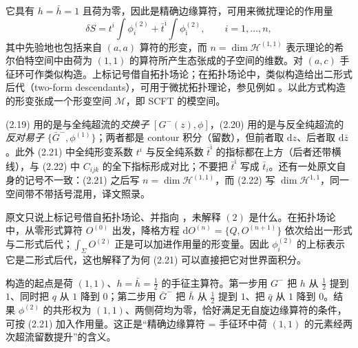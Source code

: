 它具有 $h=\bar h=1$ 且荷为零，因此是精确边缘算符，可用来微扰理论的作用量
\begin{equation}\tag{2.21}
\delta S=t^{i}\int\phi_{i}^{(2)}+\bar t^{\bar{\imath}}\int\phi_{\bar{\imath}}^{(2)},\qquad i=1,\ldots,n,
\end{equation}
其中先验地也包括来自 $(a,a)$ 算符的形变，而 $n=\dim\mathcal{H}^{(1,1)}$ 表示理论的希尔伯特空间中由荷为 $(1,1)$ 的算符所产生态张成的子空间的维数。对 $(a,c)$ 手征环可作类似构造。上标记号借自拓扑场论；在拓扑场论中，类似构造给出二形式后代（two-form descendants），可用于微扰拓扑理论，参见例如 \cite{ref33}。以此方式构造的形变张成一个形变空间 $\mathcal{M}$，即 SCFT 的模空间。

\begin{yizhu}[易错点]
(2.19) 用的是与全纯超流的\emph{交换子} $[G^{-}(z),\phi]$，(2.20) 用的是与反全纯超流的\emph{反对易子} $\{\bar G^{-},\phi^{(1)}\}$；两者都是 contour 积分（留数），但前者取 $\mathrm{d}z$、后者取 $\mathrm{d}\bar z$。此外 (2.21) 中全纯形变系数 $t^{i}$ 与反全纯系数 $\bar t^{\bar{\imath}}$ 的指标都在上方（后者还带横线），与 (2.22) 中 $C_{ijk}$ 的全下指标形成对比；不要把 $\bar t^{\bar{\imath}}$ 写成 $\bar t_{i}$。还有一处原文自身的记号不一致：(2.21) 之后写 $n=\dim\mathcal{H}^{(1,1)}$，而 (2.22) 写 $\dim\mathcal{H}^{1,1}$，同一空间带不带括号混用，译文照录。
\end{yizhu}

\begin{yizhu}[含糊点]
原文只说上标记号借自拓扑场论、并指向 \cite{ref33}，未解释 $(2)$ 是什么。在拓扑场论中，从零形式算符 $O^{(0)}$ 出发，降格方程 $\mathrm{d}O^{(n)}=\{Q,O^{(n+1)}\}$ 依次给出一形式与二形式后代；$\int_{\Sigma}O^{(2)}$ 正是可以加进作用量的形变量。因此 $\phi_{i}^{(2)}$ 的上标表示它是二形式后代，这也解释了为何 (2.21) 可以直接把它对世界面积分。
\end{yizhu}

\begin{yizhu}[物理图像]
构造的起点是荷 $(1,1)$、$h=\bar h=\frac{1}{2}$ 的手征主算符。第一步用 $G^{-}$ 把 $h$ 从 $\frac{1}{2}$ 提到 $1$、同时把 $q$ 从 $1$ 降到 $0$；第二步用 $\bar G^{-}$ 把 $\bar h$ 从 $\frac{1}{2}$ 提到 $1$、把 $\bar q$ 从 $1$ 降到 $0$。结果 $\phi^{(2)}$ 的共形权为 $(1,1)$、两侧荷均为零，恰好满足无自旋边缘算符的条件，可按 (2.21) 加入作用量。这正是“精确边缘算符 = 手征环中荷 $(1,1)$ 的元素经两次超流留数提升”的含义。
\end{yizhu}

